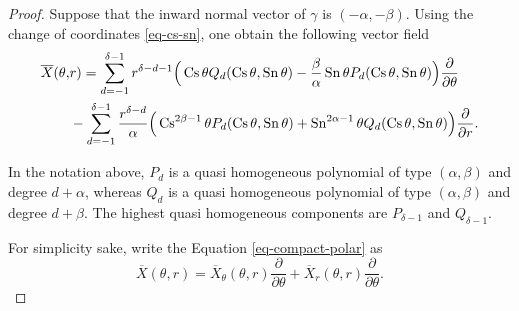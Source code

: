 \documentclass[12pt]{amsart}
\begin{document}
\begin{proof}
Suppose that the inward normal vector of $\gamma$ is $(-\alpha,-\beta)$. Using the change of coordinates \eqref{eq-cs-sn}, one obtain the following vector field
\begin{equation}\label{eq-compact-polar}
\begin{split}
\overline{X}(\theta, & r) = \displaystyle\sum_{d = -1}^{\delta - 1}r^{\delta - d - 1}\Big{(}\operatorname{Cs}\theta Q_{d}(\operatorname{Cs}\theta,\operatorname{Sn}\theta) - \displaystyle\frac{\beta}{\alpha}\operatorname{Sn}\theta P_{d}(\operatorname{Cs}\theta,\operatorname{Sn}\theta)\Big{)} \displaystyle\frac{\partial}{\partial \theta} \\
& -\displaystyle\sum_{d = -1}^{\delta - 1}\displaystyle\frac{r^{\delta - d}}{\alpha}\Big{(}\operatorname{Cs}^{2\beta - 1}
\theta P_{d}(\operatorname{Cs}\theta,\operatorname{Sn}\theta) + \operatorname{Sn}^{2\alpha - 1}
\theta Q_{d}(\operatorname{Cs}\theta,\operatorname{Sn}\theta)\Big{)} \displaystyle\frac{\partial}{\partial r}.
\end{split}
\end{equation}

In the notation above, $P_{d}$ is a quasi homogeneous polynomial of type $(\alpha,\beta)$ and degree $d + \alpha$, whereas $Q_{d}$ is a quasi homogeneous polynomial of type $(\alpha,\beta)$ and degree $d + \beta$. The highest quasi homogeneous components are $P_{\delta-1}$ and $Q_{\delta - 1}$.

For simplicity sake, write the Equation \eqref{eq-compact-polar} as
$$\overline{X}(\theta, r) = \overline{X}_{\theta}(\theta, r)\displaystyle\frac{\partial}{\partial \theta} + \overline{X}_{r}(\theta, r)\displaystyle\frac{\partial}{\partial \theta}.$$


\end{proof}
\end{document}
